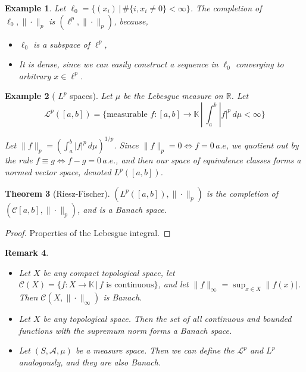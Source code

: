 \documentclass[12pt, oneside, a4paper]{article}
\newtheorem{thm}{Theorem}[section]
\theoremstyle{dfn}
\newtheorem{rem}[thm]{Remark}
\newtheorem{ex}[thm]{Example}
\newcommand{\R}{\mathbb{R}}
\newcommand{\K}{\mathbb{K}}
\begin{document}
\begin{ex}
    Let $\ell_0 = \{ (x_i) \, | \, \# \{ i, x_i \neq 0 \} < \infty \}$.  The completion of $\ell_0, \| \cdot \|_p$ is $(\ell^p, \| \cdot \|_p )$, because,
    \begin{itemize}
        \item $\ell_0$ is a subspace of $\ell^p$,
        \item It is dense, since we can easily construct a sequence in $\ell_0$ converging to arbitrary $x \in \ell^p$.
    \end{itemize}
\end{ex}
\begin{ex}[ $L^p$ spaces]
    Let $\mu$ be the Lebesgue measure on $\R$.  Let \[
        \mathcal{L}^p([a,b]) = \{ \text{measurable } f: [a,b] \rightarrow \K \, | \, \int_a^b |f|^p \, d \mu < \infty \}
    \]
    
    Let $\| f \|_p = \left( \int_a^b |f|^p \, d \mu \right)^{1/p}$.  Since $\| f \|_p = 0 \iff f = 0 \, a.e$, we quotient out by the rule $f \equiv g \iff f - g = 0 \, a.e.$, and then our space of equivalence classes forms a normed vector space, denoted $L^p([a,b])$.
\end{ex}

\begin{thm}[Riesz-Fischer] $(L^p([a,b]), \| \cdot \|_p )$ is the completion of $(\mathcal{C}[a,b], \| \cdot \|_p )$, and is a Banach space.
\end{thm}
\begin{proof}
    Properties of the Lebesgue integral.
\end{proof}

\begin{rem}{\ }
    \begin{itemize}
        \item Let $X$ be any compact topological space, let $\mathcal{C}(X) = \{ f : X \rightarrow \K \, | \, \text{$f$ is continuous} \}$, and let $\|f \|_\infty = \sup_{x \in X} \|f(x)|$.  Then $\mathcal{C}(X, \| \cdot \|_\infty)$ is Banach.  
        \item Let $X$ be any topological space.  Then the set of all continuous and bounded functions with the supremum norm forms a Banach space.
        \item Let $(S, \mathcal{A}, \mu)$ be a measure space.  Then we can define the $\mathcal{L}^p$ and $L^p$ analogously, and they are also Banach.
    \end{itemize}
\end{rem}
\end{document}
